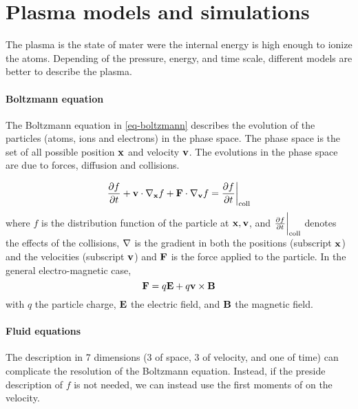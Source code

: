 

\section*{Plasma models and simulations}
\label{sec-simulations}

The plasma is the state of mater were the internal energy is high enough to ionize the atoms.
Depending of the pressure, energy, and time scale, different models are better to describe the plasma.

\paragraph{Boltzmann equation \\}
The Boltzmann equation in \cref{eq-boltzmann} describes the evolution of the particles (atoms, ions and electrons) in the phase space.
The phase space is the set of all possible position ${\mathbf x}$ and velocity ${\mathbf v}$.
The evolutions in the phase space are due to forces, diffusion and collisions.

\begin{equation} \label{eq-boltzmann}
\frac{\partial f}{\partial t}  + {\mathbf v} \cdot {\mathbf \nabla}_{{\mathbf x}} f + {\mathbf F} \cdot  {\mathbf \nabla}_{{\mathbf v}} f = \frac{\partial f}{\partial t} \bigg\vert_{\rm coll}
\end{equation}
where $f$ is the distribution function of the particle at ${\mathbf x}, {\mathbf v}$, and $\frac{\partial f}{\partial t} \bigg\vert_{\rm coll}$ denotes the effects of the collisions, ${\mathbf \nabla}$ is the gradient in both the positions (subscript ${\mathbf x}$) and the velocities (subscript ${\mathbf v}$)  and ${\mathbf F}$ is the force applied to the particle.
In the general electro-magnetic case,
\begin{equation*} \label{eq-forceEM}
  {\mathbf F} =  q {\mathbf E} + q {\mathbf v} \times {\mathbf B}
\end{equation*}
with $q$ the particle charge, ${\mathbf E}$ the electric field, and ${\mathbf B}$ the magnetic field.

\paragraph{Fluid equations \\}
The description in 7 dimensions (3 of space, 3 of velocity, and one of time) can complicate the resolution of the Boltzmann equation.
Instead, if the preside description of $f$ is not needed, we can instead use the first moments of  on the velocity.

